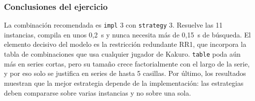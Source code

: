 \subsubsection{Conclusiones del ejercicio}

La combinación recomendada es \texttt{impl} 3 con \texttt{strategy} 3. Resuelve las 11 instancias, compila en unos 0,2~s y nunca necesita más de 0,15~s de búsqueda. El elemento decisivo del modelo es la restricción redundante RR1, que incorpora la tabla de combinaciones que usa cualquier jugador de Kakuro. \texttt{table} poda aún más en series cortas, pero su tamaño crece factorialmente con el largo de la serie, y por eso solo se justifica en series de hasta 5 casillas. Por último, los resultados muestran que la mejor estrategia depende de la implementación: las estrategias deben compararse sobre varias instancias y no sobre una sola.
